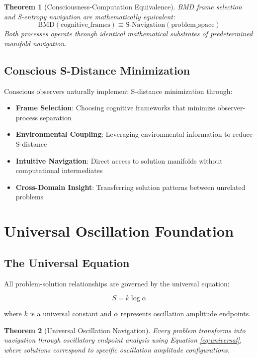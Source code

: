 \documentclass[11pt]{article}
\newtheorem{theorem}{Theorem}
\begin{document}
\begin{theorem}[Consciousness-Computation Equivalence]
BMD frame selection and S-entropy navigation are mathematically equivalent:
\begin{equation}
\text{BMD}(\text{cognitive\_frames}) \equiv \text{S-Navigation}(\text{problem\_space})
\end{equation}
Both processes operate through identical mathematical substrates of predetermined manifold navigation.
\end{theorem}

\subsection{Conscious S-Distance Minimization}

Conscious observers naturally implement S-distance minimization through:

\begin{itemize}
\item \textbf{Frame Selection}: Choosing cognitive frameworks that minimize observer-process separation
\item \textbf{Environmental Coupling}: Leveraging environmental information to reduce S-distance  
\item \textbf{Intuitive Navigation}: Direct access to solution manifolds without computational intermediates
\item \textbf{Cross-Domain Insight}: Transferring solution patterns between unrelated problems
\end{itemize}

\section{Universal Oscillation Foundation}

\subsection{The Universal Equation}

All problem-solution relationships are governed by the universal equation:

\begin{equation}
S = k \log \alpha
\label{eq:universal}
\end{equation}

where $k$ is a universal constant and $\alpha$ represents oscillation amplitude endpoints.

\begin{theorem}[Universal Oscillation Navigation]
Every problem transforms into navigation through oscillatory endpoint analysis using Equation \ref{eq:universal}, where solutions correspond to specific oscillation amplitude configurations.
\end{theorem}
\end{document}
